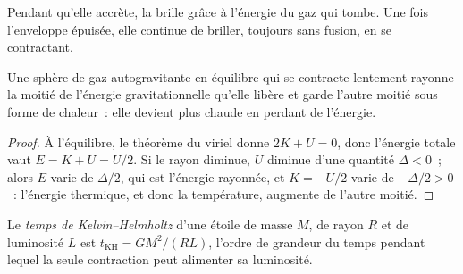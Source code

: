 \begin{omfigure}
\par{}
\end{omfigure}

Pendant qu'elle accrète, la  brille grâce à l'énergie du gaz qui tombe. Une fois
l'enveloppe épuisée, elle continue de briller, toujours sans fusion, en se
contractant.

\begin{proposition}
\label{prop:b2:ism-star-formation:contraction}
Une sphère de gaz autogravitante en équilibre qui se contracte lentement rayonne la moitié
de l'énergie gravitationnelle qu'elle libère et garde l'autre moitié sous forme de chaleur~: elle devient plus chaude en perdant de
l'énergie.
\end{proposition}

\begin{proof}
À l'équilibre, le théorème du viriel donne $2K + U = 0$, donc l'énergie totale
vaut $E = K + U = U/2$. Si le rayon diminue, $U$ diminue d'une quantité $\Delta < 0$~; alors $E$ varie de $\Delta/2$, qui est l'énergie rayonnée, et
$K = -U/2$ varie de $-\Delta/2 > 0$~: l'énergie thermique, et donc la température, augmente de
l'autre
moitié.
\end{proof}

\begin{definition}\label{def:b2:ism-star-formation:kh-time}
Le \emph{temps de Kelvin--Helmholtz} d'une
étoile de masse $M$, de rayon $R$ et de luminosité $L$ est $t_{\mathrm{KH}} = GM^2/(RL)$, l'ordre de grandeur du temps pendant lequel la
seule contraction peut alimenter sa
luminosité.
\end{definition}

